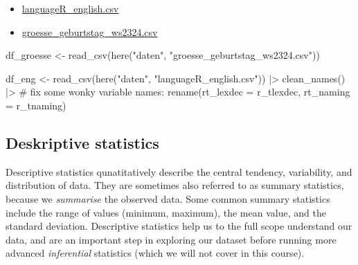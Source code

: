 \documentclass[
  letterpaper,
  DIV=11,
  numbers=noendperiod]{scrartcl}
\newenvironment{Shaded}{\begin{snugshade}}{\end{snugshade}}
\newcommand{\AttributeTok}[1]{\textcolor[rgb]{0.40,0.45,0.13}{#1}}
\newcommand{\CommentTok}[1]{\textcolor[rgb]{0.37,0.37,0.37}{#1}}
\newcommand{\FunctionTok}[1]{\textcolor[rgb]{0.28,0.35,0.67}{#1}}
\newcommand{\NormalTok}[1]{\textcolor[rgb]{0.00,0.23,0.31}{#1}}
\newcommand{\OtherTok}[1]{\textcolor[rgb]{0.00,0.23,0.31}{#1}}
\newcommand{\SpecialCharTok}[1]{\textcolor[rgb]{0.37,0.37,0.37}{#1}}
\newcommand{\StringTok}[1]{\textcolor[rgb]{0.13,0.47,0.30}{#1}}
\providecommand{\tightlist}{%
  \setlength{\itemsep}{0pt}\setlength{\parskip}{0pt}}\usepackage{longtable,booktabs,array}
\begin{document}
\begin{itemize}
\tightlist
\item
  \href{https://github.com/daniela-palleschi/r4ling_student/blob/main/daten/languageR_english.csv}{languageR\_english.csv}
\item
  \href{https://github.com/daniela-palleschi/r4ling_student/blob/main/daten/groesse_geburtstag_ws2324.csv}{groesse\_geburtstag\_ws2324.csv}
\end{itemize}

\begin{Shaded}
\begin{Highlighting}[]
\NormalTok{df\_groesse }\OtherTok{\textless{}{-}} \FunctionTok{read\_csv}\NormalTok{(}\FunctionTok{here}\NormalTok{(}\StringTok{"daten"}\NormalTok{, }\StringTok{"groesse\_geburtstag\_ws2324.csv"}\NormalTok{))}
\end{Highlighting}
\end{Shaded}

\begin{Shaded}
\begin{Highlighting}[]
\NormalTok{df\_eng }\OtherTok{\textless{}{-}} \FunctionTok{read\_csv}\NormalTok{(}\FunctionTok{here}\NormalTok{(}\StringTok{"daten"}\NormalTok{, }\StringTok{"languageR\_english.csv"}\NormalTok{)) }\SpecialCharTok{|\textgreater{}} 
  \FunctionTok{clean\_names}\NormalTok{() }\SpecialCharTok{|\textgreater{}} 
  \CommentTok{\# fix some wonky variable names:}
  \FunctionTok{rename}\NormalTok{(}\AttributeTok{rt\_lexdec =}\NormalTok{ r\_tlexdec,}
         \AttributeTok{rt\_naming =}\NormalTok{ r\_tnaming)}
\end{Highlighting}
\end{Shaded}

\hypertarget{deskriptive-statistics}{%
\subsection{Deskriptive statistics}\label{deskriptive-statistics}}

Descriptive statistics qunatitatively describe the central tendency,
variability, and distribution of data. They are sometimes also referred
to as summary statistics, because we \emph{summarise} the observed data.
Some common summary statistics include the range of values (minimum,
maximum), the mean value, and the standard deviation. Descriptive
statistics help us to the full scope understand our data, and are an
important step in exploring our dataset before running more advanced
\emph{inferential} statistics (which we will not cover in this course).
\end{document}
